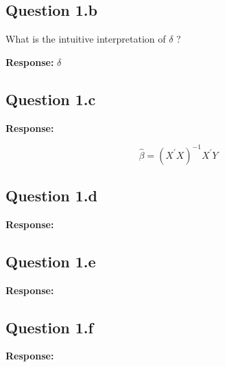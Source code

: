\documentclass{article}
\begin{document}
\subsection*{Question 1.b} What is the intuitive interpretation of \(\delta\) ? 

\textbf{Response:} 
\(\delta\)


\subsection*{Question 1.c}
\textbf{Response:} 


\[\hat{\beta} = (X^{'}X)^{-1}X^{'}Y \]

 

\subsection*{Question 1.d}
\textbf{Response:} 


\subsection*{Question 1.e}
\textbf{Response:} 


\subsection*{Question 1.f}
\textbf{Response:} 
\end{document}
